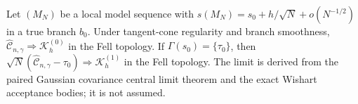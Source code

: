 Let \((M_N)\) be a local model sequence with \(s(M_N)=s_0+h/\sqrt N+o(N^{-1/2})\) in a true branch \(b_0\). Under tangent-cone regularity and branch smoothness, \(\widehat{\mathcal C}_{n,\gamma}\Rightarrow\mathcal K_h^{(0)}\) in the Fell topology. If \(\Gamma(s_0)=\{\tau_0\}\), then \(\sqrt N(\widehat{\mathcal C}_{n,\gamma}-\tau_0)\Rightarrow\mathcal K_h^{(1)}\) in the Fell topology. The limit is derived from the paired Gaussian covariance central limit theorem and the exact Wishart acceptance bodies; it is not assumed.